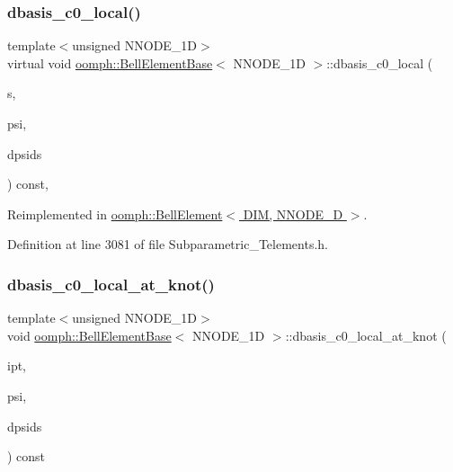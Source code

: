 \subsubsection{\texorpdfstring{dbasis\+\_\+c0\+\_\+local()}{dbasis\_c0\_local()}}
{\footnotesize\ttfamily template$<$unsigned N\+N\+O\+D\+E\+\_\+1D$>$ \\
virtual void \hyperlink{classoomph_1_1BellElementBase}{oomph\+::\+Bell\+Element\+Base}$<$ N\+N\+O\+D\+E\+\_\+1D $>$\+::dbasis\+\_\+c0\+\_\+local (\begin{DoxyParamCaption}\item[{const \hyperlink{classoomph_1_1Vector}{Vector}$<$ double $>$ \&}]{s,  }\item[{\hyperlink{classoomph_1_1Shape}{Shape} \&}]{psi,  }\item[{\hyperlink{classoomph_1_1DShape}{D\+Shape} \&}]{dpsids }\end{DoxyParamCaption}) const\hspace{0.3cm}{\ttfamily [inline]}, {\ttfamily [virtual]}}



Reimplemented in \hyperlink{classoomph_1_1BellElement_a3a7b703738e3de182b26b299626d869a}{oomph\+::\+Bell\+Element$<$ D\+I\+M, N\+N\+O\+D\+E\+\_\+D $>$}.



Definition at line 3081 of file Subparametric\+\_\+\+Telements.\+h.

\mbox{\label{classoomph_1_1BellElementBase_a1d20473bb357a28c9aeea91454b4c959}} 
\subsubsection{\texorpdfstring{dbasis\+\_\+c0\+\_\+local\+\_\+at\+\_\+knot()}{dbasis\_c0\_local\_at\_knot()}}
{\footnotesize\ttfamily template$<$unsigned N\+N\+O\+D\+E\+\_\+1D$>$ \\
void \hyperlink{classoomph_1_1BellElementBase}{oomph\+::\+Bell\+Element\+Base}$<$ N\+N\+O\+D\+E\+\_\+1D $>$\+::dbasis\+\_\+c0\+\_\+local\+\_\+at\+\_\+knot (\begin{DoxyParamCaption}\item[{const unsigned \&}]{ipt,  }\item[{\hyperlink{classoomph_1_1Shape}{Shape} \&}]{psi,  }\item[{\hyperlink{classoomph_1_1DShape}{D\+Shape} \&}]{dpsids }\end{DoxyParamCaption}) const\hspace{0.3cm}{\ttfamily [inline]}}



